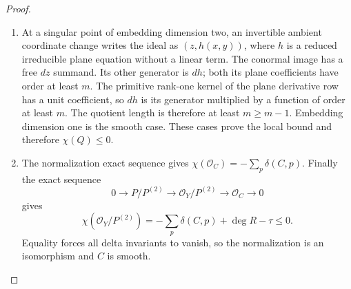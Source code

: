 \begin{proof}
\begin{enumerate}[label={$\langle1\rangle$\arabic*.},leftmargin=*]
\item At a singular point of embedding dimension two, an invertible
ambient coordinate change writes the ideal as $(z,h(x,y))$,
where $h$ is a reduced irreducible plane equation without a
linear term. The conormal image has a free $dz$ summand.
Its other generator is $dh$; both its plane coefficients have
order at least $m$. The primitive rank-one kernel of the plane
derivative row has a unit coefficient, so $dh$ is its generator
multiplied by a function of order at least $m$. The quotient
length is therefore at least $m\ge m-1$. Embedding dimension
one is the smooth case. These cases prove the local bound and
therefore $\chi(Q)\le0$.

\item The normalization exact sequence gives
$\chi(\mathcal O_C)=-\sum_p\delta(C,p)$.
Finally the exact sequence
\[
 0\longrightarrow P/P^{(2)}\longrightarrow
 \mathcal O_Y/P^{(2)}\longrightarrow\mathcal O_C
 \longrightarrow0
\]
gives
\[
 \chi(\mathcal O_Y/P^{(2)})
 =-\sum_p\delta(C,p)+\deg R-\tau\le0.
\]
Equality forces all delta invariants to vanish, so the
normalization is an isomorphism and $C$ is smooth.

\end{enumerate}
\end{proof}
